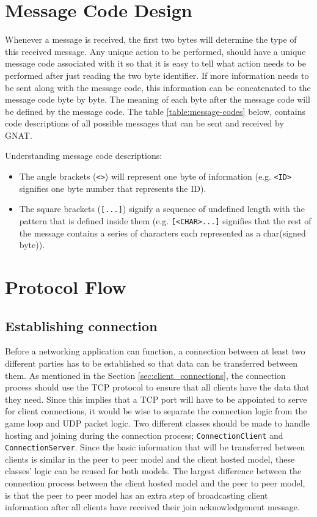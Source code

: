 \section{Message Code Design}
Whenever a message is received, the first two bytes will determine the type of this received message. Any unique action to be performed, should have a unique message code associated with it so that it is easy to tell what action needs to be performed after just reading the two byte identifier. If more information needs to be sent along with the message code, this information can be concatenated to the message code byte by byte. The meaning of each byte after the message code will be defined by the message code. The table \ref{table:message-codes} below, contains code descriptions of all possible messages that can be sent and received by GNAT.

Understanding message code descriptions:
\begin{itemize}
\item The angle brackets (\lstinline{<>}) will represent one byte of information (e.g. \lstinline{<ID>} signifies one byte number that represents the ID).
\item The square brackets (\lstinline{[...]}) signify a sequence of undefined length with the pattern that is defined inside them (e.g. \lstinline{[<CHAR>...]} signifies that the rest of the message contains a series of characters each represented as a char(signed byte)).
\end{itemize}
\vfill


\newpage

\section{Protocol Flow}

\subsection{Establishing connection}
Before a networking application can function, a connection between at least two different parties has to be established so that data can be transferred between them. As mentioned in the Section \ref{sec:client_connections}, the connection process should use the TCP protocol to ensure that all clients have the data that they need. Since this implies that a TCP port will have to be appointed to serve for client connections, it would be wise to separate the connection logic from the game loop and UDP packet logic.
Two different classes should be made to handle hosting and joining during the connection process; \lstinline{ConnectionClient} and \lstinline{ConnectionServer}. Since the basic information that will be transferred between clients is similar in the peer to peer model and the client hosted model, these classes' logic can be reused for both models. The largest difference between the connection process between the client hosted model and the peer to peer model, is that the peer to peer model has an extra step of broadcasting client information after all clients have received their join acknowledgement message.

